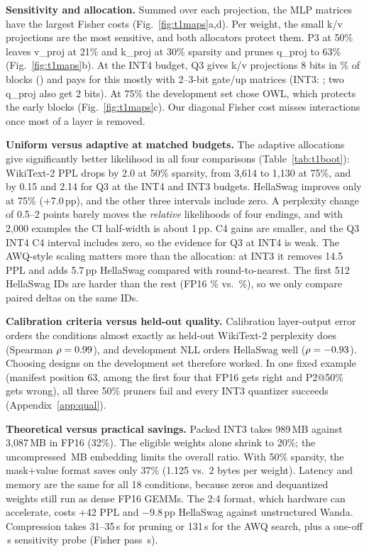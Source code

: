 \documentclass{article}
\begin{document}
\textbf{Sensitivity and allocation.} Summed over each projection, the MLP matrices have the largest Fisher costs (Fig.~\ref{fig:t1maps}a,d). Per weight, the small k/v projections are the most sensitive, and both allocators protect them. P3 at 50\% leaves v\_proj at 21\% and k\_proj at 30\% sparsity and prunes q\_proj to 63\% (Fig.~\ref{fig:t1maps}b).
At the INT4 budget, Q3 gives k/v projections 8 bits in \QfourKVeight\% of blocks (\QfourHist) and pays for this mostly with 2--3-bit gate/up matrices (INT3: \QthreeHist; two q\_proj also get 2 bits).
At 75\% the development set chose OWL, which protects the early blocks (Fig.~\ref{fig:t1maps}c). Our diagonal Fisher cost misses interactions once most of a layer is removed.

\textbf{Uniform versus adaptive at matched budgets.} The adaptive allocations give significantly better likelihood in all four comparisons (Table~\ref{tab:t1boot}): WikiText-2 PPL drops by 2.0 at 50\% sparsity, from 3{,}614 to 1{,}130 at 75\%, and by 0.15 and 2.14 for Q3 at the INT4 and INT3 budgets. HellaSwag improves only at 75\% (+7.0\,pp), and the other three intervals include zero. A perplexity change of 0.5--2 points barely moves the \emph{relative} likelihoods of four endings, and with 2{,}000 examples the CI half-width is about 1\,pp. C4 gains are smaller, and the Q3 INT4 C4 interval includes zero, so the evidence for Q3 at INT4 is weak.
The AWQ-style scaling matters more than the allocation: at INT3 it removes 14.5 PPL and adds 5.7\,pp HellaSwag compared with round-to-nearest. The first 512 HellaSwag IDs are harder than the rest (FP16 \HSfirst\% vs.\ \HSrest\%), so we only compare paired deltas on the same IDs.

\textbf{Calibration criteria versus held-out quality.} Calibration layer-output error orders the conditions almost exactly as held-out WikiText-2 perplexity does (Spearman $\rho=0.99$), and development NLL orders HellaSwag well ($\rho=-0.93$). Choosing designs on the development set therefore worked. In one fixed example (manifest position 63, among the first four that FP16 gets right and P2@50\% gets wrong), all three 50\% pruners fail and every INT3 quantizer succeeds (Appendix~\ref{app:qual}).

\textbf{Theoretical versus practical savings.} Packed INT3 takes 989\,MB against 3{,}087\,MB in FP16 (32\%). The eligible weights alone shrink to 20\%; the uncompressed \OtherMB\,MB embedding limits the overall ratio. With 50\% sparsity, the mask+value format saves only 37\% (1.125 vs.\ 2 bytes per weight). Latency and memory are the same for all 18 conditions, because zeros and dequantized weights still run as dense FP16 GEMMs. The 2:4 format, which hardware can accelerate, costs +42 PPL and $-9.8$\,pp HellaSwag against unstructured Wanda. Compression takes 31--35\,s for pruning or 131\,s for the AWQ search, plus a one-off \ProbeS\,s sensitivity probe (Fisher pass \FisherS\,s).
\end{document}
